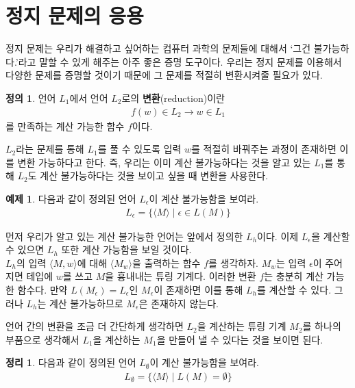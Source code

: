 \documentclass[b5paper]{book}
\theoremstyle{definition}
\newtheorem{defn}{정의}[chapter]
\newtheorem{thm}{정리}[chapter]
\newtheorem{ex}{예제}[chapter]
\newenvironment{pf*}{\pushQED{\qed}\pf}{\popQED\endpf}
\begin{document}
\section{정지 문제의 응용}
정지 문제는 우리가 해결하고 싶어하는 컴퓨터 과학의 문제들에 대해서 `그건 불가능하다.'라고 말할 수 있게
해주는 아주 좋은 증명 도구이다. 우리는 정지 문제를 이용해서 다양한 문제를 증명할 것이기 때문에
그 문제를 적절히 변환시켜줄 필요가 있다.
\begin{defn}
    언어 $L_1$에서 언어 $L_2$로의 \textbf{변환}(reduction)이란 
    \begin{align*}
        f(w) \in L_2 \rightarrow w \in L_1 
    \end{align*}
    를 만족하는 계산 가능한 함수 $f$이다.
\end{defn}
$L_2$라는 문제를 통해 $L_1$를 풀 수 있도록 입력 $w$를 적절히 바꿔주는 과정이 존재하면
이를 변환 가능하다고 한다. 즉, 우리는 이미 계산 불가능하다는 것을 알고 있는 $L_1$를 통해
$L_2$도 계산 불가능하다는 것을 보이고 싶을 때 변환을 사용한다. 
\begin{ex}
    다음과 같이 정의된 언어 $L_\epsilon$이 계산 불가능함을 보여라.
    \begin{align*}
        L_\epsilon = \{ \langle M \rangle \;\vert\; \epsilon \in L(M) \}
    \end{align*}
\end{ex}
\begin{pf*}
    먼저 우리가 알고 있는 계산 불가능한 언어는 앞에서 정의한 $L_h$이다. 이제 $L_\epsilon$을
    계산할 수 있으면 $L_h$ 또한 계산 가능함을 보일 것이다. 
    \\ $L_h$의 입력 $\langle M , w\rangle$에 대해 $\langle M_w \rangle$을 출력하는 
    함수 $f$를 생각하자. $M_w$는 입력 $\epsilon$이 주어지면 테입에 $w$를 쓰고 
    $M$을 흉내내는 튜링 기계다. 이러한 변환 $f$는 충분히 계산 가능한 함수다. 
    만약 $L(M_\epsilon) = L_\epsilon$인 $M_\epsilon$이 존재하면 이를 통해 
    $L_h$를 계산할 수 있다. 그러나 $L_h$는 계산 불가능하므로 $M_\epsilon$은 존재하지
    않는다.
\end{pf*}
언어 간의 변환을 조금 더 간단하게 생각하면 $L_2$을 계산하는 튜링 기계 $M_2$를 하나의 
부품으로 생각해서 $L_1$을 계산하는 $M_1$을 만들어 낼 수 있다는 것을 보이면 된다.
\begin{thm}
    다음과 같이 정의된 언어 $L_\emptyset$이 계산 불가능함을 보여라.
    \begin{align*}
        L_\emptyset = \{ \langle M \rangle \;\vert\; L(M) = \emptyset \}
    \end{align*}
\end{thm}
\end{document}
